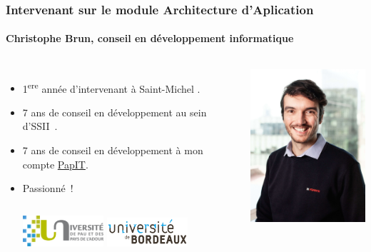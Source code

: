 \documentclass{beamer}
\begin{document}
    \begin{frame}
        \transdissolve
        \frametitle{Intervenant sur le module Architecture d'Aplication}
        \framesubtitle{Christophe Brun, conseil en développement informatique}

        \begin{columns}
            \begin{itemize}
                \item 1\textsuperscript{ere} année d'intervenant à Saint-Michel .

                \item 7 ans de conseil en développement au sein d'SSII~.

                \item 7 ans de conseil en développement à mon compte \href{https://papit.fr}{PapIT}.

                \item Passionné~!
                \bigbreak
                \begin{columns}
                    \centering
                    \includegraphics[width=3cm]{image/logo-uppa.png}
                    \centering
                    \includegraphics[width=3cm]{image/logo-universite-bordeaux.png}
                \end{columns}
            \end{itemize}
            \centering
            \includegraphics[width=5cm]{image/trombine-christophe.jpg}
        \end{columns}
    \end{frame}
\end{document}
